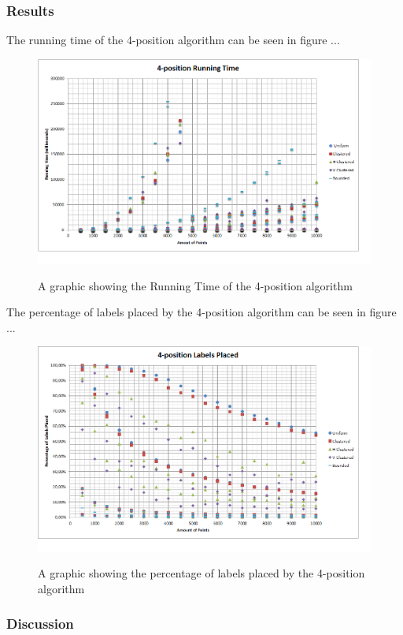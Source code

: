 \documentclass[crop=false,a4paper,oneside,11pt]{standalone}
\begin{document}
\subsubsection{Results}
The running time of the 4-position algorithm can be seen in figure ...
 \begin{figure}[h!]
 \centering
 \includegraphics[scale = 0.5]{4PosRunningTime.png}\\
 \caption{A graphic showing the Running Time of the 4-position algorithm}
 \end{figure}

The percentage of labels placed by the 4-position algorithm can be seen in figure ...
 \begin{figure}[h!]
 \centering
  \includegraphics[scale = 0.5]{4PosLabelsPlaced.png}\\
  \caption{A graphic showing the percentage of labels placed by the 4-position algorithm}
 \end{figure}
\subsubsection{Discussion}
\end{document}
